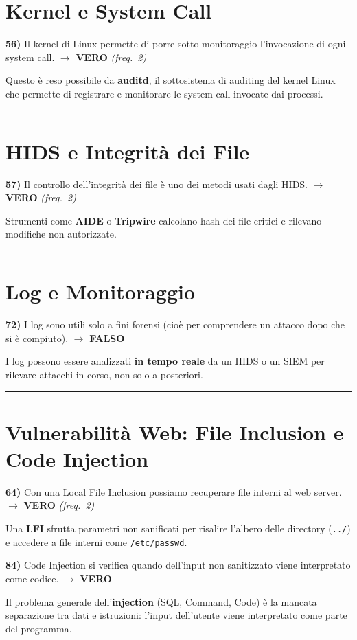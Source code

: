 \documentclass[12pt, a4paper]{report}
\newcommand{\vero}{\textcolor{verdeanswer}{\textbf{VERO}}}
\newcommand{\falso}{\textcolor{rossoanswer}{\textbf{FALSO}}}
\newcommand{\freq}[1]{\textcolor{freqcolor}{\textit{(freq.\ #1)}}}
\begin{document}
\section{Kernel e System Call}

\noindent\textbf{56)} Il kernel di Linux permette di porre sotto monitoraggio l'invocazione di ogni system call. $\to$ \vero{} \freq{2}

\medskip
\noindent Questo è reso possibile da \textbf{auditd}, il sottosistema di auditing del kernel Linux che permette di registrare e monitorare le system call invocate dai processi.

\noindent\rule{\textwidth}{0.4pt}

\section{HIDS e Integrità dei File}

\noindent\textbf{57)} Il controllo dell'integrità dei file è uno dei metodi usati dagli HIDS. $\to$ \vero{} \freq{2}

\medskip
\noindent Strumenti come \textbf{AIDE} o \textbf{Tripwire} calcolano hash dei file critici e rilevano modifiche non autorizzate.

\noindent\rule{\textwidth}{0.4pt}

\section{Log e Monitoraggio}

\noindent\textbf{72)} I log sono utili solo a fini forensi (cioè per comprendere un attacco dopo che si è compiuto). $\to$ \falso{}

\medskip
\noindent I log possono essere analizzati \textbf{in tempo reale} da un HIDS o un SIEM per rilevare attacchi in corso, non solo a posteriori.

\noindent\rule{\textwidth}{0.4pt}

\section{Vulnerabilità Web: File Inclusion e Code Injection}

\noindent\textbf{64)} Con una Local File Inclusion possiamo recuperare file interni al web server. $\to$ \vero{} \freq{2}

\medskip
\noindent Una \textbf{LFI} sfrutta parametri non sanificati per risalire l'albero delle directory (\texttt{../}) e accedere a file interni come \texttt{/etc/passwd}.

\medskip
\noindent\textbf{84)} Code Injection si verifica quando dell'input non sanitizzato viene interpretato come codice. $\to$ \vero{}

\medskip
\noindent Il problema generale dell'\textbf{injection} (SQL, Command, Code) è la mancata separazione tra dati e istruzioni: l'input dell'utente viene interpretato come parte del programma.
\end{document}
